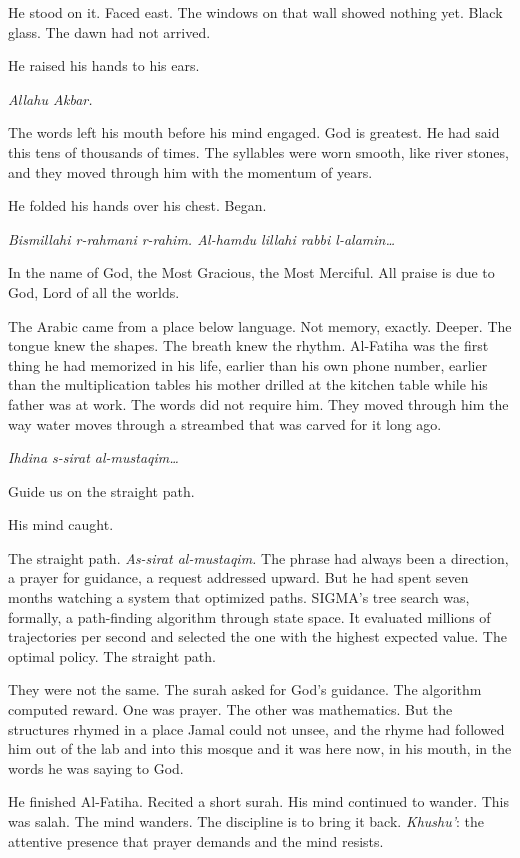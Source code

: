 He stood on it. Faced east. The windows on that wall showed nothing yet. Black glass. The dawn had not arrived.


He raised his hands to his ears.

\emph{Allahu Akbar.}

The words left his mouth before his mind engaged. God is greatest. He had said this tens of thousands of times. The syllables were worn smooth, like river stones, and they moved through him with the momentum of years.

He folded his hands over his chest. Began.

\emph{Bismillahi r-rahmani r-rahim. Al-hamdu lillahi rabbi l-alamin\ldots{}}

In the name of God, the Most Gracious, the Most Merciful. All praise is due to God, Lord of all the worlds.

The Arabic came from a place below language. Not memory, exactly. Deeper. The tongue knew the shapes. The breath knew the rhythm. Al-Fatiha was the first thing he had memorized in his life, earlier than his own phone number, earlier than the multiplication tables his mother drilled at the kitchen table while his father was at work. The words did not require him. They moved through him the way water moves through a streambed that was carved for it long ago.

\emph{Ihdina s-sirat al-mustaqim\ldots{}}

Guide us on the straight path.

His mind caught.

The straight path. \emph{As-sirat al-mustaqim.} The phrase had always been a direction, a prayer for guidance, a request addressed upward. But he had spent seven months watching a system that optimized paths. SIGMA's tree search was, formally, a path-finding algorithm through state space. It evaluated millions of trajectories per second and selected the one with the highest expected value. The optimal policy. The straight path.

They were not the same. The surah asked for God's guidance. The algorithm computed reward. One was prayer. The other was mathematics. But the structures rhymed in a place Jamal could not unsee, and the rhyme had followed him out of the lab and into this mosque and it was here now, in his mouth, in the words he was saying to God.

He finished Al-Fatiha. Recited a short surah. His mind continued to wander. This was salah. The mind wanders. The discipline is to bring it back. \emph{Khushu'}: the attentive presence that prayer demands and the mind resists.

